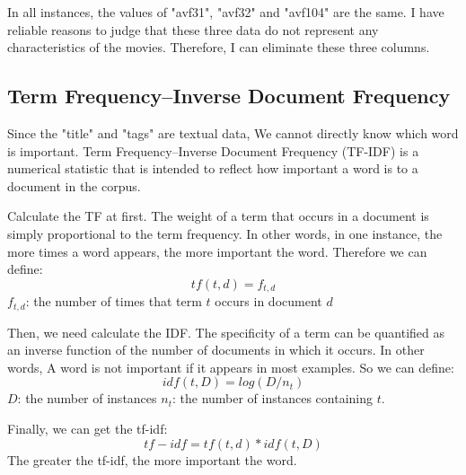 \documentclass[11pt]{article}
\begin{document}
In all instances, the values of "avf31", "avf32" and "avf104" are the same. I have reliable reasons to judge that these three data do not represent any characteristics of the movies. Therefore, I can eliminate these three columns.





\subsection{Term Frequency–Inverse Document Frequency}

Since the "title" and "tags" are textual data, We cannot directly know which word is important. Term Frequency–Inverse Document Frequency (TF-IDF) is a numerical statistic that is intended to reflect how important a word is to a document in the corpus.

Calculate the TF at first. The weight of a term that occurs in a document is simply proportional to the term frequency. In other words, in one instance, the more times a word appears, the more important the word. Therefore we can define:
\[tf(t, d) =  f_{t,d}\]
$f_{t,d}$: the number of times that term $t$ occurs in document $d$

Then, we need calculate the IDF. The specificity of a term can be quantified as an inverse function of the number of documents in which it occurs. In other words, A word is not important if it appears in most examples. So we can define:
\[idf(t, D) = log(D/n_t)\]
$D$: the number of instances
$n_t$: the number of instances containing $t$.

Finally, we can get the tf-idf:
\[tf-idf = tf(t, d) * idf(t, D)\]
The greater the tf-idf, the more important the word.
\end{document}
